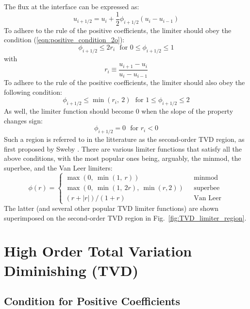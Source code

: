 \documentclass{warpdoc}
\begin{document}
The flux at the interface can be expressed as:
%
\begin{equation}
u_{i+1/2} = u_i + \frac{1}{2} \phi_{i+1/2} \left( u_i - u_{i-1} \right)
\end{equation}
% 
To adhere to the rule of the positive coefficients, the limiter should obey the condition (\ref{eqn:positive_condition_2o}):
%
\begin{equation}
\phi_{i+1/2}  \le 2 r_{i} ~~~\textrm{for~}  0 \le \phi_{i+1/2} \le 1
\end{equation}
%
with
%
\begin{equation}
r_{i} \equiv \frac{u_{i+1} - u_{i}}{u_{i} - u_{i-1}}
\end{equation}
%
To adhere to the rule of the positive coefficients, the limiter should also obey the following condition:
%
\begin{equation}
\phi_{i+1/2}  \le \min(r_{i},~2) ~~~\textrm{for~}  1 \le \phi_{i+1/2} \le 2
\end{equation}
%
As well, the limiter function should become 0 when the slope of the property changes sign:
%
\begin{equation}
\phi_{i+1/2}=0 ~~~\textrm{for~} r_i<0
\end{equation}
%
Such a region is referred to in the litterature as the second-order TVD region, as first proposed by Sweby \cite{sjna:1984:sweby}.
There are various limiter functions that satisfy all the above conditions, with the most popular ones being, arguably, the minmod, the superbee, \cite{arfm:1986:roe} and the Van Leer \cite{jcp:1974:vanleer} limiters:
%
\begin{equation}
\phi(r)= \left\{ \begin{array}{ll}
\max\left(0,~\min\left(1,~r\right)\right) & ~~~\textrm{minmod}\\
\max\left(0,~\min\left(1,~2r\right),~\min(r,2)\right) & ~~~\textrm{superbee}\\
(r+|r|)/(1+r) & ~~~\textrm{Van Leer}
\end{array}\right.
\end{equation}
%
The latter (and several other popular TVD limiter functions) are shown superimposed on the second-order TVD region in Fig.\  \ref{fig:TVD_limiter_region}.


\section{High Order Total Variation Diminishing (TVD)}

\subsection{Condition for Positive Coefficients}
\end{document}
